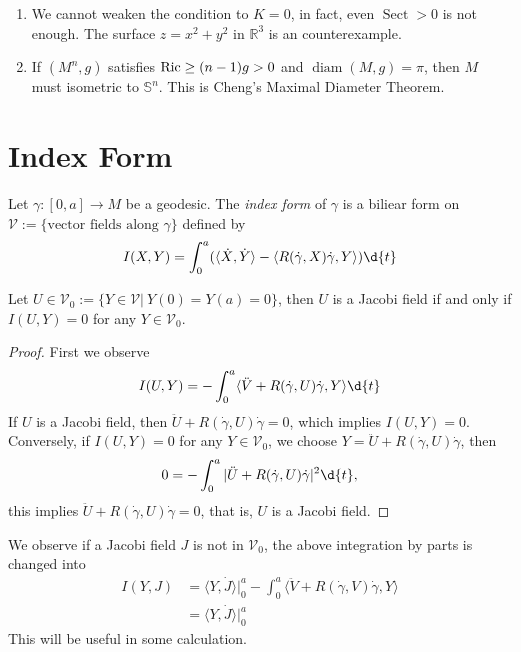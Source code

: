 \begin{rem}
    \begin{enumerate}[(1)]
        \item We cannot weaken the condition to $K=0$, in fact, even $\operatorname{Sect}>0$ is not enough.
        The surface $z=x^2+y^2$ in $\mathbb{R}^3$ is an counterexample.
        \item If $(M^n,g)$ satisfies $\operatorname{Ric}\geq(n-1)g>0$ and $\operatorname{diam}(M,g)=\pi$, then $M$ must isometric to $\mathbb{S}^n$.
        This is Cheng's Maximal Diameter Theorem.
    \end{enumerate}
\end{rem}

\section{Index Form}

\begin{defn}
    Let $\gamma:[0,a]\to M$ be a geodesic.
    The \emph{index form} of $\gamma$ is a biliear form on $\mathscr{V}:=\{\text{vector fields along }\gamma\}$ defined by
    \[I(X,Y)=\int_0^a(\langle\dot{X},\dot{Y}\rangle-\langle R(\dot{\gamma},{X})\dot{\gamma},{Y}\rangle)\d{t}\]
\end{defn}

\begin{lem}\label{jacobi field and index form}
    Let $U\in\mathscr{V}_0:=\{Y\in\mathscr{V}|\ Y(0)=Y(a)=0\}$, then $U$ is a Jacobi field if and only if $I(U,Y)=0$ for any $Y\in\mathscr{V}_0$.
\end{lem}
\begin{proof}
    First we observe
    \[I(U,Y)=-\int_0^a\langle\ddot{V}+R(\dot{\gamma},U)\dot{\gamma},Y\rangle\d{t}\]
    If $U$ is a Jacobi field, then $\ddot{U}+R(\dot{\gamma},U)\dot{\gamma}=0$, which implies $I(U,Y)=0$.
    Conversely, if $I(U,Y)=0$ for any $Y\in\mathscr{V}_0$, we choose $Y=\ddot{U}+R(\dot{\gamma},U)\dot{\gamma}$, then
    \[0=-\int_0^a|\ddot{U}+R(\dot{\gamma},U)\dot{\gamma}|^2\d{t},\]
    this implies $\ddot{U}+R(\dot{\gamma},U)\dot{\gamma}=0$, that is, $U$ is a Jacobi field.
\end{proof}

We observe if a Jacobi field $J$ is not in $\mathscr{V}_0$, the above integration by parts is changed into
\begin{equation}
    \begin{aligned}
        I(Y,J)&=\langle Y,\dot{J}\rangle|_0^a-\int_0^a\langle\ddot{V}+R(\dot{\gamma},V)\dot{\gamma},Y\rangle\\
        &=\langle Y,\dot{J}\rangle|_0^a
    \end{aligned}\label{jacobi field and index form 2}
\end{equation}
This will be useful in some calculation.

